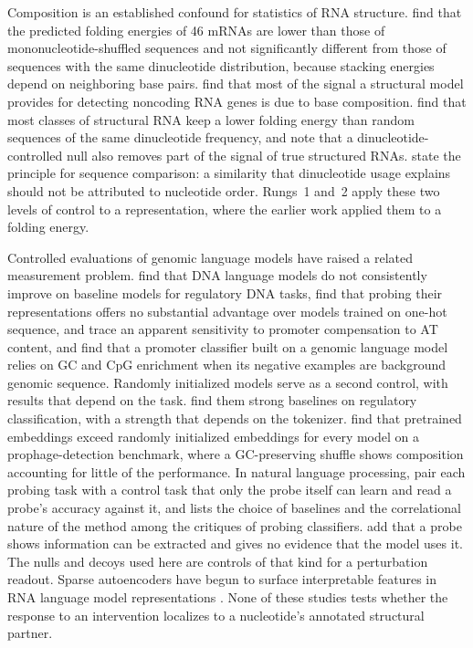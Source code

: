 \documentclass[11pt]{article}
\begin{document}
Composition is an established confound for statistics of RNA structure.
\citet{workman1999evidence} find that the predicted folding energies of 46 mRNAs
are lower than those of mononucleotide-shuffled sequences and not significantly
different from those of sequences with the same dinucleotide distribution,
because stacking energies depend on neighboring base pairs.
\citet{rivas2000secondary} find that most of the signal a structural model
provides for detecting noncoding RNA genes is due to base composition.
\citet{clote2005structural} find that most classes of structural RNA keep a
lower folding energy than random sequences of the same dinucleotide frequency,
and \citet{gesell2008dinucleotide} note that a dinucleotide-controlled null
also removes part of the signal of true structured RNAs.
\citet{altschul1985dinucleotide} state the principle for sequence comparison:
a similarity that dinucleotide usage explains should not be attributed to
nucleotide order. Rungs~1 and~2 apply these two levels of control to a
representation, where the earlier work applied them to a folding energy.

Controlled evaluations of genomic language models have raised a related
measurement problem. \citet{patel2024dart} find that DNA language models do not
consistently improve on baseline models for regulatory DNA tasks,
\citet{tang2025evaluating} find that probing their representations offers no
substantial advantage over models trained on one-hot sequence, and
\citet{cheng2026mechanistic} trace an apparent sensitivity to promoter
compensation to AT content, and \citet{hadad2026optimizing} find that a promoter
classifier built on a genomic language model relies on GC and CpG enrichment
when its negative examples are background genomic sequence. Randomly
initialized models serve as a second control, with results that depend on the
task. \citet{vishniakov2024tokenization} find them strong baselines on
regulatory classification, with a strength that depends on the tokenizer.
\citet{lindsey2026lambda} find that pretrained embeddings exceed randomly
initialized embeddings for every model on a prophage-detection benchmark, where
a GC-preserving shuffle shows composition accounting for little of the
performance. In natural language processing,
\citet{hewitt2019designing} pair each probing task with a control task that
only the probe itself can learn and read a probe's accuracy against it, and
\citet{belinkov2022probing} lists the choice of baselines and the correlational
nature of the method among the critiques of probing classifiers.
\citet{elazar2021amnesic} add that a probe shows information can be extracted
and gives no evidence that the model uses it. The nulls and
decoys used here are controls of that kind for a perturbation readout. Sparse
autoencoders have begun to surface interpretable features in RNA language model
representations \citep{kim2025saerna}. None of
these studies tests whether the response to an intervention localizes to a
nucleotide's annotated structural partner.
\end{document}
